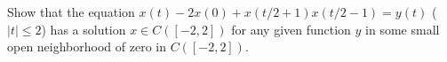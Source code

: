 Show that the equation $x(t)-2x(0)+x(t/2+1)x(t/2-1)=y(t)$ ($|t|\leq
2$) has a solution $x\in C([-2,2])$ for any given function $y$ in some
small open neighborhood of zero in $C([-2,2])$.
